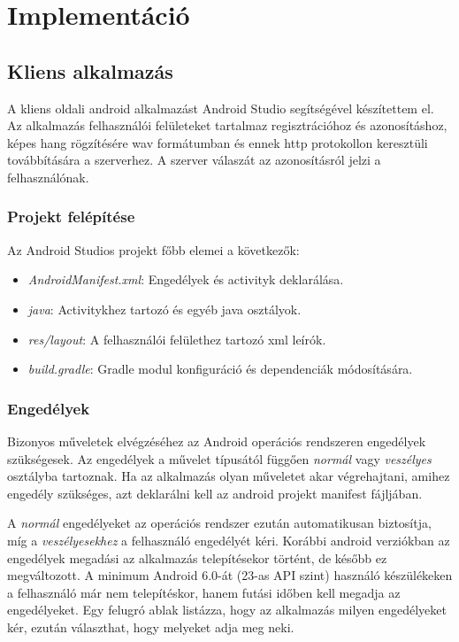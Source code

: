 \section{Implementáció}

\subsection{Kliens alkalmazás}

A kliens oldali android alkalmazást Android Studio segítségével készítettem el. Az alkalmazás felhasználói felületeket tartalmaz regisztrációhoz és azonosításhoz, képes hang rögzítésére wav formátumban és ennek http protokollon keresztüli továbbítására a szerverhez. A szerver válaszát az azonosításról jelzi a felhasználónak. 

\subsubsection{Projekt felépítése}

Az Android Studios projekt főbb elemei a következők:

\begin{itemize}
	\item \emph{AndroidManifest.xml}: Engedélyek és activityk deklarálása.
	\item \emph{java}: Activitykhez tartozó és egyéb java osztályok.
	\item \emph{res/layout}: A felhasználói felülethez tartozó xml leírók.
	\item \emph{build.gradle}: Gradle modul konfiguráció és dependenciák módosítására.
\end{itemize}

\subsubsection{Engedélyek}

Bizonyos műveletek elvégzéséhez az Android operációs rendszeren engedélyek szükségesek. Az engedélyek a művelet típusától függően \emph{normál} vagy \emph{veszélyes} osztályba tartoznak. Ha az alkalmazás olyan műveletet akar végrehajtani, amihez engedély szükséges, azt deklarálni kell az android projekt manifest fájljában.

A \emph{normál} engedélyeket az operációs rendszer ezután automatikusan biztosítja, míg a \emph{veszélyesekhez} a felhasználó engedélyét kéri. Korábbi android verziókban az engedélyek megadási az alkalmazás telepítésekor történt, de később ez megváltozott. A minimum Android 6.0-át (23-as API szint) használó készülékeken a felhasználó már nem telepítéskor, hanem futási időben kell megadja az engedélyeket. Egy felugró ablak listázza, hogy az alkalmazás milyen engedélyeket kér, ezután választhat, hogy melyeket adja meg neki.


